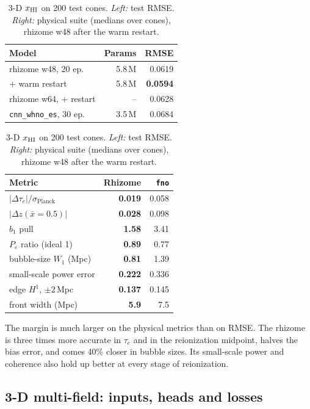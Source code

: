 \begin{table}[!tp]
  \centering
  \caption{3-D $x_{\mathrm{HI}}$ on 200 test cones. \emph{Left:} test RMSE. \emph{Right:} physical suite (medians over cones), rhizome w48 after the warm restart.}
  \label{tab:results-3d}
  \small
  \begin{tabular}[t]{lrr}
    \toprule
    Model & Params & RMSE \\
    \midrule
    rhizome w48, 20 ep. & 5.8\,M & 0.0619 \\
    \quad + warm restart & 5.8\,M & \textbf{0.0594} \\
    rhizome w64, + restart & -- & 0.0628 \\
    \texttt{cnn\_whno\_es}, 30 ep. & 3.5\,M & 0.0684 \\
    \bottomrule
  \end{tabular}
  \hspace{1.2em}
  \begin{tabular}[t]{lrr}
    \toprule
    Metric & Rhizome & \texttt{fno} \\
    \midrule
    $|\Delta\tau_e|/\sigma_{\mathrm{Planck}}$ & \textbf{0.019} & 0.058 \\
    $|\Delta z(\bar x=0.5)|$ & \textbf{0.028} & 0.098 \\
    $b_1$ pull & \textbf{1.58} & 3.41 \\
    $P_\varepsilon$ ratio (ideal 1) & \textbf{0.89} & 0.77 \\
    bubble-size $W_1$ (Mpc) & \textbf{0.81} & 1.39 \\
    small-scale power error & \textbf{0.222} & 0.336 \\
    edge $H^1$, $\pm2$\,Mpc & \textbf{0.137} & 0.145 \\
    front width (Mpc) & \textbf{5.9} & 7.5 \\
    \bottomrule
  \end{tabular}
\end{table}

The margin is much larger on the physical metrics than on RMSE. The rhizome is three times more accurate in $\tau_e$ and in the reionization midpoint, halves the bias error, and comes 40\% closer in bubble sizes. Its small-scale power and coherence also hold up better at every stage of reionization.

\subsection{3-D multi-field: inputs, heads and losses}
\label{sec:results-3d-mf}

